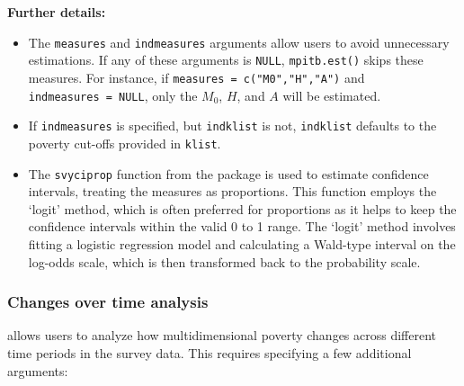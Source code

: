 \textbf{Further details:}

\begin{itemize}
\item
  The \texttt{measures} and \texttt{indmeasures} arguments allow users to avoid unnecessary estimations. If any of these arguments is \texttt{NULL}, \texttt{mpitb.est()} skips these measures. For instance, if \texttt{measures\ =\ c("M0","H","A")} and \texttt{indmeasures\ =\ NULL}, only the \(M_0\), \(H\), and \(A\) will be estimated.
\item
  If \texttt{indmeasures} is specified, but \texttt{indklist} is not, \texttt{indklist} defaults to the poverty cut-offs provided in \texttt{klist}.
\item
  The \texttt{svyciprop} function from the  package is used to estimate confidence intervals, treating the measures as proportions. This function employs the `logit' method, which is often preferred for proportions as it helps to keep the confidence intervals within the valid 0 to 1 range. The `logit' method involves fitting a logistic regression model and calculating a Wald-type interval on the log-odds scale, which is then transformed back to the probability scale.
\end{itemize}

\subsubsection{Changes over time analysis}\label{changes-over-time-analysis}

 allows users to analyze how multidimensional poverty changes across different time periods in the survey data. This requires specifying a few additional arguments:

